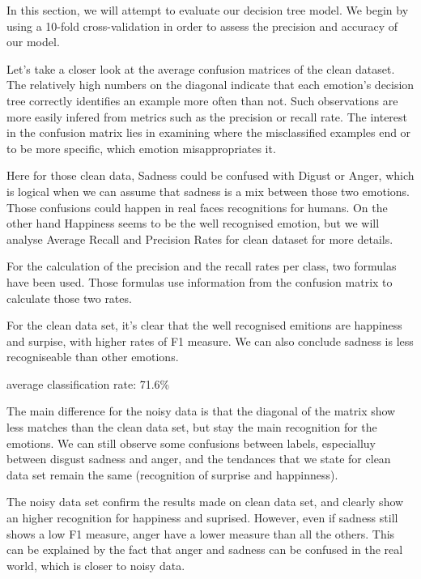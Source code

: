 In this section, we will attempt to evaluate our decision tree model. We begin by using a 10-fold cross-validation
in order to assess the precision and accuracy of our model. 

Let's take a closer look at the average confusion matrices of the clean dataset. The relatively high numbers on the diagonal indicate that
each emotion's decision tree correctly identifies an example more often than not. Such observations are more easily infered from metrics such as the precision or recall rate. The interest in the confusion matrix lies in examining where the misclassified examples end or to be more specific, which emotion misappropriates it. 




Here for those clean data, Sadness could be confused with Digust or Anger, which is logical when we can assume that sadness is a mix between those two emotions. 
Those confusions could happen in real faces recognitions for humans.
On the other hand Happiness seems to be the well recognised emotion, but we will
analyse Average Recall and Precision Rates for clean dataset for more details. 




For the calculation of the precision and the recall rates per class, two formulas have been used.
Those formulas use information from the confusion matrix to calculate those two rates.

For the clean data set, it's clear that the well recognised emitions are happiness and surpise, with higher rates of F1 measure. 
We can also conclude sadness is less recogniseable than other emotions.


average classification rate:
71.6\%
 


The main difference for the noisy data is that the diagonal of the matrix show less matches than the clean data set, but stay the main recognition for the emotions.
We can still observe some confusions between labels, especialluy between disgust sadness and anger, and the tendances that we state for clean data set remain the same (recognition of surprise and happinness).




The noisy data set confirm the results made on clean data set, and clearly show an higher recognition for happiness and suprised. However, even if sadness still shows a low F1 measure, anger have a lower measure than all the others. This can be explained by the fact that anger and sadness can be confused in the real world, which is closer to noisy data. 


